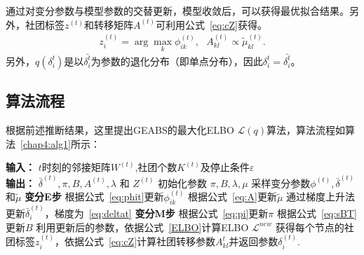 通过对变分参数与模型参数的交替更新，模型收敛后，可以获得最优拟合结果。另外，社团标签$z^{(t)}$和转移矩阵$A^{(t)}$可利用公式~\ref{eq:cZ}获得。
\begin{equation}
\begin{split}
z^{(t)}_i = \arg \max_k \phi_{ik}^{(t)}, ~~~A_{kl}^{(t)} \propto \tilde{\mu}_{kl}^{(t)}.
\end{split}
\label{eq:cZ}
\end{equation}
另外，$q(\delta_i^t)$是以$\bar{\delta_i^t}$为参数的退化分布（即单点分布），因此$\delta_i^t = \bar{\delta_i^t}$。



\subsection{算法流程}
根据前述推断结果，这里提出GEABS的最大化ELBO $\mathscr{L}(q)$算法，算法流程如算法~\ref{chap4:alg1}所示：

\begin{algorithm}[H]
\caption{GEABS模型 ELBO $\mathcal{L}$ 的优化算法}\label{chap4:alg1}

\begin{algorithmic}[1]
\STATE \textbf{输入：} $t$时刻的邻接矩阵$W^{(t)}$,社团个数$K^{(t)}$及停止条件$\varepsilon$\\
\STATE \textbf{输出：} $\bar{\delta}^{(t)}, \pi, B, A^{(t)},\lambda$ 和 $Z^{(t)}$
\STATE 初始化参数 $\pi,B,\lambda, \mu$
\STATE 采样变分参数$\phi^{(t)},\bar{\delta}^{(t)}$和$\tilde{\mu}$
\REPEAT
    \STATE \textbf{变分E步}
    \STATE 根据公式~\ref{eq:phit}更新$\phi^{(t)}_{ik}$
    \STATE 根据公式~\ref{eq:A}更新$\tilde{\mu}$
     \STATE 通过梯度上升法更新$\bar{\delta}_i^{(t)}$，梯度为~\ref{eq:deltat}
    \STATE \textbf{变分M步}
    \STATE 根据公式~\ref{eq:pi}更新$\pi$
    \STATE 根据公式~\ref{eq:sBT}更新$B$
    \STATE 利用更新后的参数，依据公式~\ref{ELBO}计算ELBO $\mathcal{L}^{new}$
\ENDFOR
{}
\STATE 获得每个节点的社团标签$z^{(t)}_i$，依据公式~\ref{eq:cZ}计算社团转移参数$A_{kl}^t$并返回参数$\delta^{(t)}_i$.
\ENDFOR  
\end{algorithmic}
\end{algorithm}

